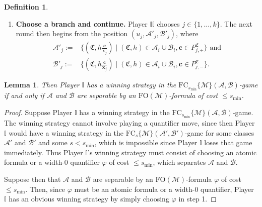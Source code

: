 \documentclass{article}
\newtheorem{lemma}[theorem]{Lemma}
\theoremstyle{definition}
\newtheorem{definition}[theorem]{Definition}
\begin{document}
\begin{definition}
\begin{enumerate}
        \[
            (B,P^{\mathfrak{B}}_{1,+},\dots,P^{\mathfrak{B}}_{k,+},P^\mathfrak{B}_{1,-},\dots,P^\mathfrak{B}_{k,-})\in \mathcal{D}.
        \]
        (If such choices do not exist, Player $\mathbb{II}$ wins the game immediately.)
        \item \textbf{Choose a branch and continue.} Player $\mathbb{II}$ chooses $j\in\{1,\dots,k\}$. The next round then begins from the position $(u_j,\mathcal{A}'_j, \mathcal{B}'_j)$, where
        \begin{align*}
            \mathcal{A}'_j:=&\{(\mathfrak{C},h\frac{\textbf{c}}{\textbf{x}_j})\mid (\mathfrak{C},h)\in \mathcal{A}_i\cup\mathcal{B}_i,\textbf{c}\in P^\mathfrak{C}_{j,+}\}\text{ and}\\
            \mathcal{B}'_j:=&\{(\mathfrak{C},h\frac{\textbf{c}}{\textbf{x}_j})\mid (\mathfrak{C},h)\in \mathcal{A}_i\cup\mathcal{B}_i,\textbf{c}\in P^\mathfrak{C}_{j,-}\}.
        \end{align*}
    \end{enumerate}
\end{definition}

\begin{lemma}\label{minor-base-case}
    Then Player $\mathbb{I}$ has a winning strategy in the $\mathrm{FC}_{s_{\min}}\{\mathcal{M}\}(\mathcal{A},\mathcal{B})$-game if and only if $\mathcal{A}$ and $\mathcal{B}$ are separable by an $\mathrm{FO}(\mathcal{M})$-formula of cost $\leq s_{\min}$.
\end{lemma}
\begin{proof}
    Suppose Player $\mathbb{I}$ has a winning strategy in the $\mathrm{FC}_{s_{\min}}\{\mathcal{M}\}(\mathcal{A},\mathcal{B})$-game. The winning strategy cannot involve playing a quantifier move, since then Player $\mathbb{I}$ would have a winning strategy in the $\mathrm{FC}_{s}\{\mathcal{M}\}(\mathcal{A}',\mathcal{B}')$-game for some classes $\mathcal{A}'$ and $\mathcal{B}'$ and some $s<s_{\min}$, which is impossible since Player $\mathbb{I}$ loses that game immediately. Thus Player $\mathbb{I}$'s winning strategy must consist of choosing an atomic formula or a width-0 quantifier $\varphi$ of cost $\leq s_{\min}$, which separates $\mathcal{A}$ and $\mathcal{B}$.

    Suppose then that $\mathcal{A}$ and $\mathcal{B}$ are separable by an $\mathrm{FO}(\mathcal{M})$-formula $\varphi$ of cost $\leq s_{\min}$. Then, since $\varphi$ must be an atomic formula or a width-0 quantifier, Player $\mathbb{I}$ has an obvious winning strategy by simply choosing $\varphi$ in step 1.
\end{proof}
\end{document}
